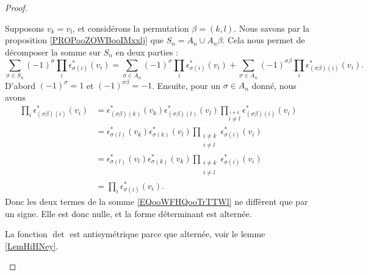 \begin{proof}
\begin{subproof}
		Supposons \( v_k=v_l\), et considérons la permutation \( \beta=(k,l)\). Nous savons par la proposition \ref{PROPooZOWBooIMxxlj} que \( S_n=A_n\cup A_n\beta\). Cela nous permet de décomposer la somme sur \( S_n\) en deux parties :
		\begin{equation}        \label{EQooWFHQooTrTTWl}
			\sum_{\sigma\in S_n}(-1)^{\sigma}\prod_i\epsilon_{\sigma(i)}^*(v_i)=\sum_{\sigma\in A_n}(-1)^{\sigma}\prod_i\epsilon_{\sigma(i)}^*(v_i)+\sum_{\sigma\in A_n}(-1)^{\sigma\beta}\prod_i\epsilon_{(\sigma\beta)(i)}^*(v_i).
		\end{equation}
		D'abord \( (-1)^{\sigma}=1\) et \( (-1)^{\sigma\beta}=-1\). Ensuite, pour un \( \sigma\in A_n\) donné, nous avons
		\begin{subequations}
			\begin{align}
                \prod_i\epsilon^*_{(\sigma\beta)(i)}(v_i) & =\epsilon_{(\sigma\beta)(k)}^*(v_k)\epsilon^*_{(\sigma\beta)(l)}(v_l)\prod_{\stackrel{i\neq k}{i\neq l}}\epsilon_{(\sigma\beta)(i)}^*(v_i) \\
				                                          & =\epsilon^*_{\sigma(l)}(v_k)\epsilon^*_{\sigma(k)}(v_l)\prod_{\substack{i\neq k                                                         \\i\neq l}}\epsilon^*_{\sigma(i)}(v_i)\\
				                                          & =\epsilon^*_{\sigma(l)}(v_l)\epsilon^*_{\sigma(k)}(v_k)\prod_{\substack{i\neq k                                                         \\i\neq l}}\epsilon^*_{\sigma(i)}(v_i)\\
				                                          & =\prod_i\epsilon^*_{\sigma(i)}(v_i).
			\end{align}
		\end{subequations}
		Donc les deux termes de la somme \eqref{EQooWFHQooTrTTWl} ne diffèrent que par un signe. Elle est donc nulle, et la forme déterminant est alternée.

		La fonction \( \det\) est antisymétrique parce que alternée, voir le lemme \ref{LemHiHNey}.


\end{subproof}
\end{proof}
